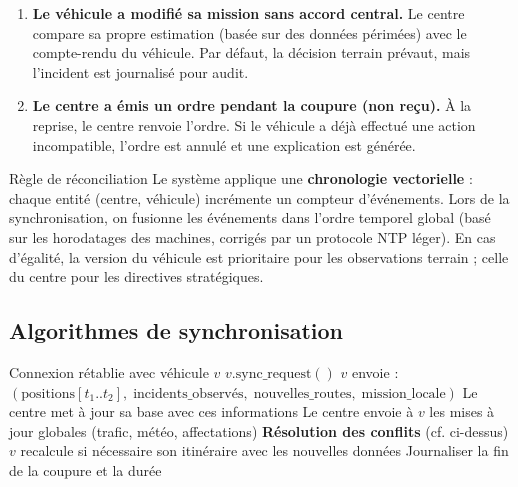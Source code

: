 \documentclass[12pt,a4paper]{article}
\theoremstyle{definition}
\theoremstyle{remark}
\begin{document}
\begin{enumerate}[leftmargin=2em, itemsep=4pt]
  \item \textbf{Le véhicule a modifié sa mission sans accord central.}
        Le centre compare sa propre estimation (basée sur des données
        périmées) avec le compte-rendu du véhicule. Par défaut, la
        décision terrain prévaut, mais l’incident est journalisé pour
        audit.
  \item \textbf{Le centre a émis un ordre pendant la coupure (non reçu).}
        À la reprise, le centre renvoie l’ordre. Si le véhicule a déjà
        effectué une action incompatible, l’ordre est annulé et une
        explication est générée.
\end{enumerate}

\begin{metierbox}{Règle de réconciliation}
Le système applique une \textbf{chronologie vectorielle} : chaque
entité (centre, véhicule) incrémente un compteur d’événements.
Lors de la synchronisation, on fusionne les événements dans l’ordre
temporel global (basé sur les horodatages des machines, corrigés
par un protocole NTP léger). En cas d’égalité, la version du véhicule
est prioritaire pour les observations terrain ; celle du centre pour
les directives stratégiques.
\end{metierbox}

\subsection{Algorithmes de synchronisation}

\begin{algorithm}[H]
\caption{Synchronisation après coupure (côté centre)}
\begin{algorithmic}[1]
\Require Connexion rétablie avec véhicule $v$
\State $v.\text{sync\_request}()$
\State $v$ envoie : $( \text{positions}[t_1..t_2],\;
       \text{incidents\_observés},\; \text{nouvelles\_routes},\;
       \text{mission\_locale} )$
\State Le centre met à jour sa base avec ces informations
\State Le centre envoie à $v$ les mises à jour globales 
       (trafic, météo, affectations)
\State \textbf{Résolution des conflits} (cf. ci-dessus)
\State $v$ recalcule si nécessaire son itinéraire avec les nouvelles données
\State Journaliser la fin de la coupure et la durée
\end{algorithmic}
\end{algorithm}

\newpage
\end{document}
